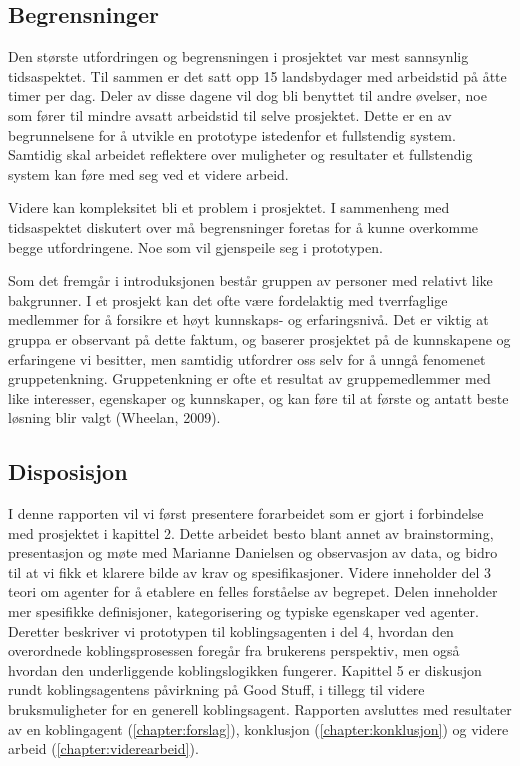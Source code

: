 \subsection{Begrensninger}

Den største utfordringen og begrensningen i prosjektet var mest sannsynlig tidsaspektet. Til sammen er det satt opp 15 landsbydager med arbeidstid på åtte timer per dag. Deler av disse dagene vil dog bli benyttet til andre øvelser, noe som fører til mindre avsatt arbeidstid til selve prosjektet. Dette er en av begrunnelsene for å utvikle en prototype istedenfor et fullstendig system. Samtidig skal arbeidet reflektere over muligheter og resultater et fullstendig system kan føre med seg ved et videre arbeid.

Videre kan kompleksitet bli et problem i prosjektet. I sammenheng med tidsaspektet diskutert over må begrensninger foretas for å kunne overkomme begge utfordringene. Noe som vil gjenspeile seg i prototypen.

Som det fremgår i introduksjonen består gruppen av personer med relativt like bakgrunner. I et prosjekt kan det ofte være fordelaktig med tverrfaglige medlemmer for å forsikre et høyt kunnskaps- og erfaringsnivå. Det er viktig at gruppa er observant på dette faktum, og baserer prosjektet på de kunnskapene og erfaringene vi besitter, men samtidig utfordrer oss selv for å unngå fenomenet gruppetenkning. Gruppetenkning er ofte et resultat av gruppemedlemmer med like interesser, egenskaper og kunnskaper, og kan føre til at første og antatt beste løsning blir valgt (Wheelan, 2009).

\subsection{Disposisjon}

I denne rapporten vil vi først presentere forarbeidet som er gjort i forbindelse med prosjektet i kapittel 2. Dette arbeidet besto blant annet av brainstorming, presentasjon og møte med Marianne Danielsen og observasjon av data, og bidro til at vi fikk et klarere bilde av krav og spesifikasjoner. Videre inneholder del 3 teori om agenter for å etablere en felles forståelse av begrepet. Delen inneholder mer spesifikke definisjoner, kategorisering og typiske egenskaper ved agenter. Deretter beskriver vi prototypen til koblingsagenten i del 4, hvordan den overordnede koblingsprosessen foregår fra brukerens perspektiv, men også hvordan den underliggende koblingslogikken fungerer. Kapittel 5 er diskusjon rundt koblingsagentens påvirkning på Good Stuff, i tillegg til videre bruksmuligheter for en generell koblingsagent. Rapporten avsluttes med resultater av en koblingagent (\ref{chapter:forslag}), konklusjon (\ref{chapter:konklusjon}) og videre arbeid (\ref{chapter:viderearbeid}).
